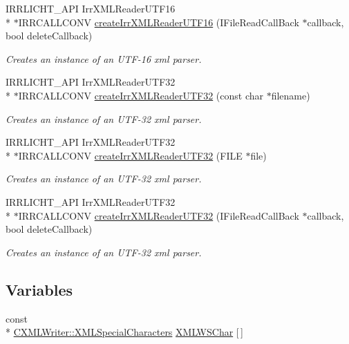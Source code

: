 \begin{DoxyCompactItemize}
I\-R\-R\-L\-I\-C\-H\-T\-\_\-\-A\-P\-I Irr\-X\-M\-L\-Reader\-U\-T\-F16 \\*
$\ast$I\-R\-R\-C\-A\-L\-L\-C\-O\-N\-V \hyperlink{namespaceirr_1_1io_ad928a7dd3e1975d7002a9d0f912e4e6c}{create\-Irr\-X\-M\-L\-Reader\-U\-T\-F16} (I\-File\-Read\-Call\-Back $\ast$callback, bool delete\-Callback)
\begin{DoxyCompactList}\small\item\em Creates an instance of an U\-T\-F-\/16 xml parser. \end{DoxyCompactList}\item 
I\-R\-R\-L\-I\-C\-H\-T\-\_\-\-A\-P\-I Irr\-X\-M\-L\-Reader\-U\-T\-F32 \\*
$\ast$I\-R\-R\-C\-A\-L\-L\-C\-O\-N\-V \hyperlink{namespaceirr_1_1io_ae05bf7ee342431ea8c98fb98e75b974a}{create\-Irr\-X\-M\-L\-Reader\-U\-T\-F32} (const char $\ast$filename)
\begin{DoxyCompactList}\small\item\em Creates an instance of an U\-T\-F-\/32 xml parser. \end{DoxyCompactList}\item 
I\-R\-R\-L\-I\-C\-H\-T\-\_\-\-A\-P\-I Irr\-X\-M\-L\-Reader\-U\-T\-F32 \\*
$\ast$I\-R\-R\-C\-A\-L\-L\-C\-O\-N\-V \hyperlink{namespaceirr_1_1io_a4ea88dd2598272cff85357611a5e5938}{create\-Irr\-X\-M\-L\-Reader\-U\-T\-F32} (F\-I\-L\-E $\ast$file)
\begin{DoxyCompactList}\small\item\em Creates an instance of an U\-T\-F-\/32 xml parser. \end{DoxyCompactList}\item 
I\-R\-R\-L\-I\-C\-H\-T\-\_\-\-A\-P\-I Irr\-X\-M\-L\-Reader\-U\-T\-F32 \\*
$\ast$I\-R\-R\-C\-A\-L\-L\-C\-O\-N\-V \hyperlink{namespaceirr_1_1io_a155a0833d1d8d3bbf359863979044032}{create\-Irr\-X\-M\-L\-Reader\-U\-T\-F32} (I\-File\-Read\-Call\-Back $\ast$callback, bool delete\-Callback)
\begin{DoxyCompactList}\small\item\em Creates an instance of an U\-T\-F-\/32 xml parser. \end{DoxyCompactList}\end{DoxyCompactItemize}
\subsection*{Variables}
\begin{DoxyCompactItemize}
\item 
const \\*
\hyperlink{structirr_1_1io_1_1_c_x_m_l_writer_1_1_x_m_l_special_characters}{C\-X\-M\-L\-Writer\-::\-X\-M\-L\-Special\-Characters} \hyperlink{namespaceirr_1_1io_a78e999cc77f54407a8d7725ffcd1d84b}{X\-M\-L\-W\-S\-Char} \mbox{[}$\,$\mbox{]}
\end{DoxyCompactItemize}


